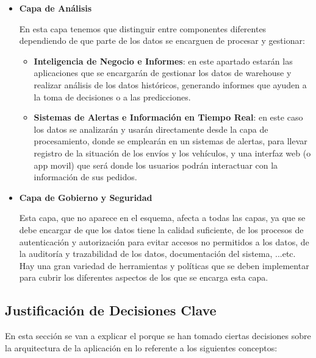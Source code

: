 \begin{itemize}
	\item \textbf{Capa de Análisis}
	
	En esta capa tenemos que distinguir entre componentes diferentes dependiendo de que parte de los datos se encarguen de procesar y gestionar:
	
	\begin{itemize}
		\item \textbf{Inteligencia de Negocio e Informes}: en este apartado estarán las aplicaciones que se encargarán de gestionar los datos de warehouse y realizar análisis de los datos históricos, generando informes que ayuden a la toma de decisiones o a las predicciones.
		
		\item \textbf{Sistemas de Alertas e Información en Tiempo Real}: en este caso los datos se analizarán y usarán directamente desde la capa de procesamiento, donde se emplearán en un sistemas de alertas, para llevar registro de la situación de los envíos y los vehículos, y una interfaz web (o app movil) que será donde los usuarios podrán interactuar con la información de sus pedidos.
	\end{itemize}
	
	\item \textbf{Capa de Gobierno y Seguridad}
	
	Esta capa, que no aparece en el esquema, afecta a todas las capas, ya que se debe encargar de que los datos tiene la calidad suficiente, de los procesos de autenticación y autorización para evitar accesos no permitidos a los datos, de la auditoría y trazabilidad de los datos, documentación del sistema, ...etc. Hay una gran variedad de herramientas y políticas que se deben implementar para cubrir los diferentes aspectos de los que se encarga esta capa. 
\end{itemize}

\subsection{Justificación de Decisiones Clave}

En esta sección se van a explicar el porque se han tomado ciertas decisiones sobre la arquitectura de la aplicación en lo referente a los siguientes conceptos:

